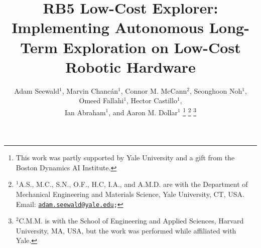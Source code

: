 \documentclass[letterpaper,10pt,conference,twoside]{IEEEtran}
\theoremstyle{definition}
\begin{document}

\title{\LARGE\bf RB5 Low-Cost Explorer: Implementing Autonomous Long-Term Exploration on Low-Cost Robotic Hardware}%

\author{Adam Seewald${}^\text{1}$, Marvin Chanc{\'a}n${}^\text{1}$, Connor M. McCann${}^\text{2}$, Seonghoon Noh${}^\text{1}$, Omeed Fallahi${}^\text{1}$, Hector Castillo${}^\text{1}$,\\ %
Ian Abraham${}^\text{1}$, and Aaron M. Dollar${}^\text{1}$%
  \thanks{This work was partly supported by Yale University and a gift from the Boston Dynamics AI Institute.}
  \thanks{${}^\text{1}$A.\hspace*{.4ex}S., M.\hspace*{.4ex}C., S.\hspace*{.4ex}N., O.\hspace*{.4ex}F., H.\hspace*{.4ex}C, I.\hspace*{.4ex}A., and A.\hspace*{.4ex}M.\hspace*{.4ex}D. are with the Department of Mechanical Engineering and Materials Science, Yale University, CT, USA. Email: {\tt\footnotesize \href{mailto:adam.seewald@yale.edu}{adam.seewald@yale.edu};}}
  \thanks{${}^\text{2}$C.\hspace*{.4ex}M.\hspace*{.4ex}M. is with the School of Engineering and Applied Sciences, Harvard University, MA, USA, but the work was performed while affiliated with Yale.}
}
\end{document}

